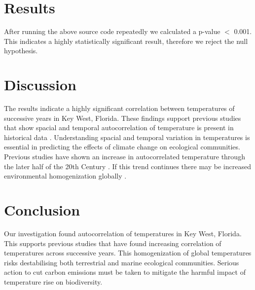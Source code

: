\documentclass[final,3p]{CSP}
\begin{document}
\section{Results}
After running the above source code repeatedly we calculated a p-value $<$ 0.001. This indicates a highly statistically significant result, therefore we reject the null hypothesis.

\section{Discussion}
The results indicate a highly significant correlation between temperatures of successive years in Key West, Florida. These findings support previous studies that show spacial and temporal autocorrelation of temperature is present in historical data  \cite{GraceJ.DiCecco2018Isat}. Understanding spacial and temporal variation in temperatures is essential in predicting the effects of climate change on ecological communities. Previous studies have shown an increase in autocorrelated temperature through the later half of the 20th Century \cite{DillonMichaelE.2016LitF}. If this trend continues there may be increased environmental homogenization globally \cite{LixinWu2012Ewot}.

\section{Conclusion}
Our investigation found autocorrelation of temperatures in Key West, Florida. This supports previous studies that have found increasing correlation of temperatures across successive years. This homogenization of global temperatures risks destabilising both terrestrial and marine ecological communities. Serious action to cut carbon emissions must be taken to mitigate the harmful impact of temperature rise on biodiversity.

\it



 \label{}
\end{document}
